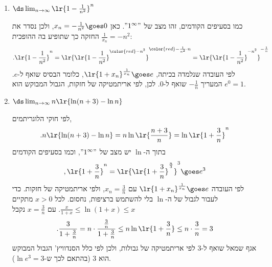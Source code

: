 \begin{enumerate}
\begin{solbox}
בנוסף, לא קשה להשתכנע כי
$$,\displaystyle\lim_{n\to\infty}\frac{n^2+3}{2n+5}\cdot\frac{10n+3}{3n^2-6-5n}=\frac{5}{3}$$
לכן מאריתמטיקה של חזקות, הגבול המבוקש הוא
$e^{\frac{5}{3}}$.
\end{solbox}
\item $\ds\lim_{n \to \infty} \lr{1-\frac{1}{n^2}}^{n}$
\begin{solbox}
כמו בסעיפים הקודמים, זהו מצב של
$"1^{\infty}"$.
כאן $x_n=-\frac{1}{n^2}\goes0$, ולכן נסדר את החזקה כך שתופיע בה ההופכית $\frac{1}{x_n}=-n^2$:
$$.\lr{1-\frac{1}{n^2}}^{n}=\lr{\lr{1-\frac{1}{n^2}}^{{\color{red}-n^2}}}^{{\color{red}-\frac{1}{n^2}}\cdot n}=\lr{\lr{1-\frac{1}{n^2}}^{-n^2}}^{-\frac{1}{n}}$$
לפי העובדה שנלמדה בכיתה, $\lr{1+x_n}^{\frac{1}{x_n}}\goes e$, כלומר הבסיס שואף ל-$e$. המעריך $-\frac1n$ שואף ל-$0$.
לכן, לפי אריתמטיקה של חזקות, הגבול המבוקש הוא
$e^0=1$.
\end{solbox}
\item $\ds\lim_{n \to \infty} n\lr{\ln(n+3)-\ln n}$
\begin{solbox}
לפי חוקי הלוגריתמים,
$$.n\lr{\ln(n+3)-\ln n}=n\ln\lr{\frac{n+3}{n}}=\ln\lr{1+\frac3n}^{n}$$
בתוך ה-$\ln$ יש מצב של
$"1^{\infty}"$,
וכמו בסעיפים הקודמים
$$,\lr{1+\frac3n}^{n}=\lr{\lr{1+\frac3n}^{\frac n3}}^{3}\goes e^3$$
לפי העובדה $\lr{1+x_n}^{\frac{1}{x_n}}\goes e$ עם $x_n=\frac3n$, ולפי אריתמטיקה של חזקות.
כדי לעבור לגבול של ה-$\ln$ בלי להשתמש ברציפות, נחסום. לכל $x>0$ מתקיים $\frac{x}{1+x}\le\ln(1+x)\le x$. עם $x=\frac3n$ נקבל
$$.\frac{3}{1+\frac3n}=n\cdot\frac{\frac3n}{1+\frac3n}\le n\ln\lr{1+\frac3n}\le n\cdot\frac3n=3$$
אגף שמאל שואף ל-$3$ לפי אריתמטיקה של גבולות, ולכן לפי כלל הסנדוויץ' הגבול המבוקש הוא
$3$
(בהתאם לכך ש-$\ln e^3=3$).
\end{solbox}
\eMs
\end{enumerate}
